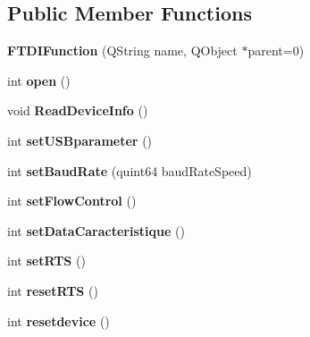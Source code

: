 \subsection*{Public Member Functions}
\begin{DoxyCompactItemize}
\item 
\mbox{\label{class_f_t_d_i_function_a582806d13d62872fdec2b3a1edd473bf}} 
{\bfseries F\+T\+D\+I\+Function} (Q\+String name, Q\+Object $\ast$parent=0)
\item 
\mbox{\label{class_f_t_d_i_function_a97fdb1089696a2a032cf4dcfb1758321}} 
int {\bfseries open} ()
\item 
\mbox{\label{class_f_t_d_i_function_ab3bb4afe6c66a29cc123f9eaec837dc8}} 
void {\bfseries Read\+Device\+Info} ()
\item 
\mbox{\label{class_f_t_d_i_function_a573a9f5642d9197e20d5428fa44c09c1}} 
int {\bfseries set\+U\+S\+Bparameter} ()
\item 
\mbox{\label{class_f_t_d_i_function_a87df52020ad1e14f04d2b53b54a8aafc}} 
int {\bfseries set\+Baud\+Rate} (quint64 baud\+Rate\+Speed)
\item 
\mbox{\label{class_f_t_d_i_function_a0917a4322eba684562d8ef58722eaf2d}} 
int {\bfseries set\+Flow\+Control} ()
\item 
\mbox{\label{class_f_t_d_i_function_a220841d49e8b759c8d12cbcc9f09d446}} 
int {\bfseries set\+Data\+Caracteristique} ()
\item 
\mbox{\label{class_f_t_d_i_function_abd76beba817e126781253623da5dfe5d}} 
int {\bfseries set\+R\+TS} ()
\item 
\mbox{\label{class_f_t_d_i_function_a3c8e7182369a3cc645167b6c2ebb2907}} 
int {\bfseries reset\+R\+TS} ()
\item 
\mbox{\label{class_f_t_d_i_function_a6d12f937c2cc6e74d0653476932c8e44}} 
int {\bfseries resetdevice} ()
\item 

\end{DoxyCompactItemize}
